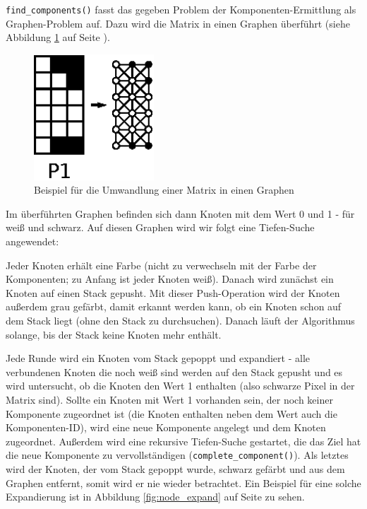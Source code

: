 \verb+find_components()+ fasst das gegeben Problem der Komponenten-Ermittlung als Graphen-Problem auf. Dazu wird die Matrix in einen Graphen überführt (siehe Abbildung \ref{fig:matrix_graph} auf Seite \pageref{fig:matrix_graph}).

\begin{figure}[tbhp]
	\centering
	\includegraphics[width=0.4\textwidth]{images/matrix_graph.eps}
	\caption{Beispiel für die Umwandlung einer Matrix in einen Graphen}
	\label{fig:matrix_graph}
\end{figure}

Im überführten Graphen befinden sich dann Knoten mit dem Wert 0 und 1 - für weiß und schwarz. Auf diesen Graphen wird wir folgt eine Tiefen-Suche angewendet:

Jeder Knoten erhält eine Farbe (nicht zu verwechseln mit der Farbe der Komponenten; zu Anfang ist jeder Knoten weiß). Danach wird zunächst ein Knoten auf einen Stack gepusht. Mit dieser Push-Operation wird der Knoten außerdem grau gefärbt, damit erkannt werden kann, ob ein Knoten schon auf dem Stack liegt (ohne den Stack zu durchsuchen). Danach läuft der Algorithmus solange, bis der Stack keine Knoten mehr enthält.

Jede Runde wird ein Knoten vom Stack gepoppt und expandiert - alle verbundenen Knoten die noch weiß sind werden auf den Stack gepusht und es wird untersucht, ob die Knoten den Wert 1 enthalten (also schwarze Pixel in der Matrix sind). Sollte ein Knoten mit Wert 1 vorhanden sein, der noch keiner Komponente zugeordnet ist (die Knoten enthalten neben dem Wert auch die Komponenten-ID), wird eine neue Komponente angelegt und dem Knoten zugeordnet. Außerdem wird eine rekursive Tiefen-Suche gestartet, die das Ziel hat die neue Komponente zu vervollständigen (\verb+complete_component()+). Als letztes wird der Knoten, der vom Stack gepoppt wurde, schwarz gefärbt und aus dem Graphen entfernt, somit wird er nie wieder betrachtet. Ein Beispiel für eine solche Expandierung ist in Abbildung \ref{fig:node_expand} auf Seite \pageref{fig:node_expand} zu sehen.

